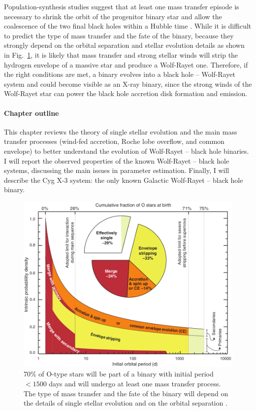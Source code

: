 \documentclass[a4paper,titlepage]{book}     	%
\begin{document}
Population-synthesis studies suggest that at least one mass transfer episode is necessary to shrink the orbit of the progenitor binary star and allow the coalescence of the two final black holes within a Hubble time \cite{spera2019_mergingBBH}. While it is difficult to predict the type of mass transfer and the fate of the binary, because they strongly depend on the orbital separation and stellar evolution details as shown in Fig.\ \ref{fig:Sana2012MTfate}, it is likely that mass transfer and strong stellar winds will strip the hydrogen envelope of a massive star and produce a Wolf-Rayet one. Therefore, if the right conditions are met, a binary evolves into a black hole -- Wolf-Rayet system and could become visible as an X-ray binary, since the strong winds of the Wolf-Rayet star can power the black hole accretion disk formation and emission.

\paragraph{Chapter outline}
This chapter reviews the theory of single stellar evolution and the main mass transfer processes (wind-fed accretion, Roche lobe overflow, and common envelope) to better understand the evolution of Wolf-Rayet -- black hole binaries. I will report the observed properties of the known Wolf-Rayet -- black hole systems, discussing the main issues in parameter estimation. Finally, I will describe the Cyg X-3 system: the only known Galactic Wolf-Rayet -- black hole binary.


\begin{figure}[h!]
	\centering
	\includegraphics[width=.65\textwidth]{./images/Sana2012MTfate.png}
	\caption{70\% of O-type stars will be part of a binary with initial period $< 1500$ days and will undergo at least one mass transfer process. The type of mass transfer and the fate of the binary will depend on the details of single stellar evolution and on the orbital separation \cite{Sana2012}.}\label{fig:Sana2012MTfate}
\end{figure}
\end{document}
